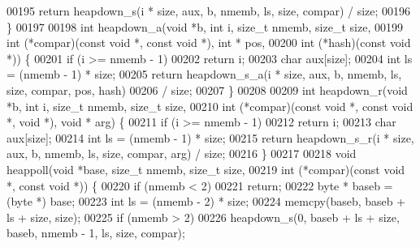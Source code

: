 \begin{DoxyCode}
00195         \textcolor{keywordflow}{return} heapdown\_s(i * size, aux, b, nmemb, ls, size, compar) / size;
00196 \}
00197 
00198 \textcolor{keywordtype}{int} heapdown\_a(\textcolor{keywordtype}{void} *b, \textcolor{keywordtype}{int} i, \textcolor{keywordtype}{size\_t} nmemb, \textcolor{keywordtype}{size\_t} size,
00199                 \textcolor{keywordtype}{int} (*compar)(\textcolor{keyword}{const} \textcolor{keywordtype}{void} *, \textcolor{keyword}{const} \textcolor{keywordtype}{void} *), \textcolor{keywordtype}{int} * pos,
00200                 \textcolor{keywordtype}{int} (*hash)(\textcolor{keyword}{const} \textcolor{keywordtype}{void} *)) \{
00201         \textcolor{keywordflow}{if} (i >= nmemb - 1)
00202                 \textcolor{keywordflow}{return} i;
00203         \textcolor{keywordtype}{char} aux[size];
00204         \textcolor{keywordtype}{int} ls = (nmemb - 1) * size;
00205         \textcolor{keywordflow}{return} heapdown\_s\_a(i * size, aux, b, nmemb, ls, size, compar, pos, hash)
00206                         / size;
00207 \}
00208 
00209 \textcolor{keywordtype}{int} heapdown\_r(\textcolor{keywordtype}{void} *b, \textcolor{keywordtype}{int} i, \textcolor{keywordtype}{size\_t} nmemb, \textcolor{keywordtype}{size\_t} size,
00210                 \textcolor{keywordtype}{int} (*compar)(\textcolor{keyword}{const} \textcolor{keywordtype}{void} *, \textcolor{keyword}{const} \textcolor{keywordtype}{void} *, \textcolor{keywordtype}{void} *), \textcolor{keywordtype}{void} * arg) \{
00211         \textcolor{keywordflow}{if} (i >= nmemb - 1)
00212                 \textcolor{keywordflow}{return} i;
00213         \textcolor{keywordtype}{char} aux[size];
00214         \textcolor{keywordtype}{int} ls = (nmemb - 1) * size;
00215         \textcolor{keywordflow}{return} heapdown\_s\_r(i * size, aux, b, nmemb, ls, size, compar, arg) / size;
00216 \}
00217 
00218 \textcolor{keywordtype}{void} heappoll(\textcolor{keywordtype}{void} *base, \textcolor{keywordtype}{size\_t} nmemb, \textcolor{keywordtype}{size\_t} size,
00219                 \textcolor{keywordtype}{int} (*compar)(\textcolor{keyword}{const} \textcolor{keywordtype}{void} *, \textcolor{keyword}{const} \textcolor{keywordtype}{void} *)) \{
00220         \textcolor{keywordflow}{if} (nmemb < 2)
00221                 \textcolor{keywordflow}{return};
00222         byte * baseb = (byte *) base;
00223         \textcolor{keywordtype}{int} ls = (nmemb - 2) * size;
00224         memcpy(baseb, baseb + ls + size, size);
00225         \textcolor{keywordflow}{if} (nmemb > 2)
00226                 heapdown\_s(0, baseb + ls + size, baseb, nmemb - 1, ls, size, compar);

\end{DoxyCode}
